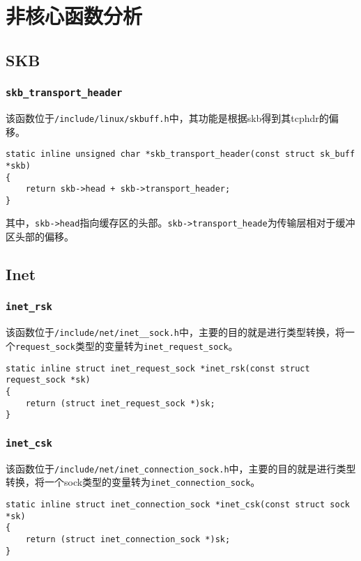 \chapter{非核心函数分析}

\minitoc

\section{SKB}
    \subsection{\texttt{skb_transport_header}}
        
        该函数位于\texttt{/include/linux/skbuff.h}中，其功能是根据skb得到其tcphdr的偏移。
\begin{verbatim}
static inline unsigned char *skb_transport_header(const struct sk_buff *skb)
{
    return skb->head + skb->transport_header;
}
\end{verbatim}

        其中，\texttt{skb->head}指向缓存区的头部。\texttt{skb->transport_heade}为传输层相对于缓冲区头部的偏移。

\section{Inet}
	\subsection{\texttt{inet_rsk}}

		该函数位于\texttt{/include/net/inet__sock.h}中，主要的目的就是进行类型转换，将一个\texttt{request_sock}类型的变量转为\texttt{inet_request_sock}。

\begin{verbatim}
static inline struct inet_request_sock *inet_rsk(const struct request_sock *sk)
{
	return (struct inet_request_sock *)sk;
}
\end{verbatim}
    
	\subsection{\texttt{inet_csk}}
        该函数位于\texttt{/include/net/inet_connection_sock.h}中，主要的目的就是进行类型转换，将一个sock类型的变量转为\texttt{inet_connection_sock}。

\begin{verbatim}
static inline struct inet_connection_sock *inet_csk(const struct sock *sk)
{
    return (struct inet_connection_sock *)sk;
}
\end{verbatim}


